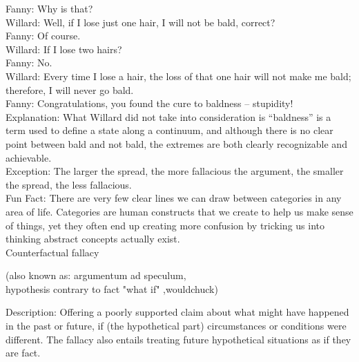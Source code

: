 \documentclass[a4paper,12pt,single,pdftex]{scrartcl}
\begin{document}
    
      Fanny: Why is that?
    \\

    
      Willard:  Well, if I lose just one hair, I will not be bald, correct?
    \\

    
      Fanny: Of course.
    \\

    
      Willard: If I lose two hairs?
    \\

    
      Fanny: No.
    \\

    
      Willard: Every time I lose a hair, the loss of that one hair will not make me bald; therefore, I will never go bald.
    \\

    
      Fanny: Congratulations, you found the cure to baldness -- stupidity!
    \\

    
      Explanation: What Willard did not take into consideration is “baldness” is a term used to define a state along a continuum, and although there is no clear point between bald and not bald, the extremes are both clearly recognizable and achievable.
    \\

    
      Exception: The larger the spread, the more fallacious the argument, the smaller the spread, the less fallacious.
    \\

    
      Fun Fact: There are very few clear lines we can draw between categories in any area of life.  Categories are human constructs that we create to help us make sense of things, yet they often end up creating more confusion by tricking us into thinking abstract concepts actually exist.
    \\

  

Counterfactual fallacy
    
      (also known as: argumentum ad speculum,
    \\

    hypothesis contrary to fact "what if" ,wouldchuck)
  
    Description: Offering a poorly supported claim about what might have happened in the past or future, if (the hypothetical part) circumstances or conditions were different.  The fallacy also entails treating future hypothetical situations as if they are fact.
\end{document}
